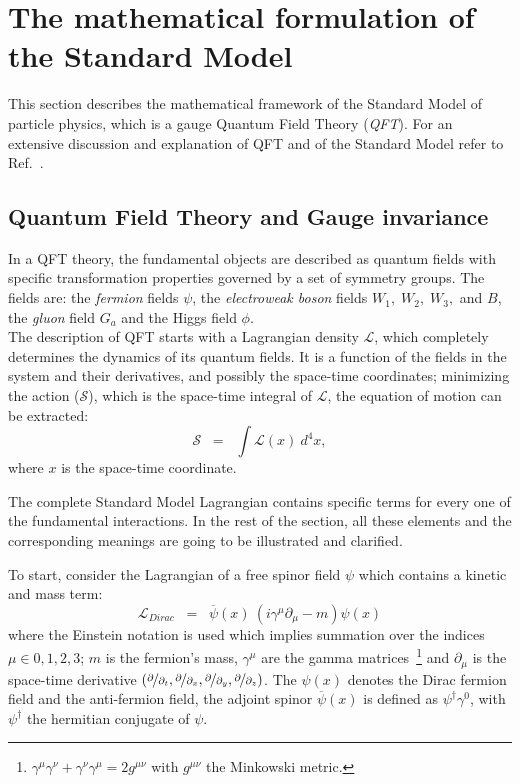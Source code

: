 \clearpage
\section{The mathematical formulation of the Standard Model}\label{sec:mathSM}
This section describes the mathematical framework of the Standard Model of particle physics, which is a gauge Quantum Field Theory (\emph{QFT}). For an extensive discussion and explanation of QFT and of the Standard Model refer to Ref.~\cite{Bardin:1999ak}.
\subsection{Quantum Field Theory and Gauge invariance}\label{sec:qft}
In a QFT theory, the fundamental objects are described as quantum fields with specific transformation properties governed by a set of symmetry groups. The fields are: the \emph{fermion} fields $\psi$, the \emph{electroweak boson} fields $W_1, \; W_2, \; W_3,$ and $B$, the \emph{gluon} field $G_a$ and the Higgs field $\phi$. \\
The description of QFT starts with a Lagrangian density $\mathcal{L}$, which completely determines the dynamics of its quantum fields. It is a function of the fields in the system and their derivatives, and possibly the space-time coordinates; minimizing the action ($\mathcal{S}$), which is the space-time integral of $\mathcal{L}$, the equation of motion can be extracted:
\begin{equation}
\label{eq:action}
 \mathcal{S} \;\; = \;\; \int \mathcal{L}(x) \ d^4x,
\end{equation}
where $x$ is the space-time coordinate.

The complete Standard Model Lagrangian contains specific terms for every one of the fundamental interactions. In the rest of the section, all these elements and the corresponding meanings are going to be illustrated and clarified.

To start, consider the Lagrangian of a free spinor field $\psi$ which contains a kinetic and mass term:
\begin{equation}
\label{eq:dirac}
 \mathcal{L}_{Dirac} \;\; = \;\; \overline{\psi}(x)\ (i\gamma^{\mu}\partial_{\mu} - m ) \psi(x)
\end{equation}
where the Einstein notation is used which implies summation over the indices $\mu \in 0,1,2,3$; $m$ is the fermion's mass, $\gamma^{\mu}$ are the gamma matrices~\footnote{$\gamma^{\mu}\gamma^{\nu} + \gamma^{\nu}\gamma^{\mu} = 2g^{\mu\nu}$ with $g^{\mu\nu}$ the Minkowski metric.} and $\partial_{\mu}$ is the space-time derivative $(\nicefrac{\partial}{\partial_{t}}, \nicefrac{\partial}{\partial_{x}}, \nicefrac{\partial}{\partial_{y}}, \nicefrac{\partial}{\partial_{z}})$. The $\psi(x)$ denotes the Dirac fermion field and the anti-fermion field, the adjoint spinor $\overline{\psi}(x)$ is defined as $\psi^\dag\gamma^{0}$, with $\psi^\dag$ the hermitian conjugate of $\psi$.

